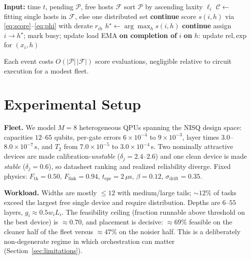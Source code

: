 \documentclass[conference]{IEEEtran}
\begin{document}
\begin{algorithm}[t]
\caption{AMOS: one orchestration event}
\label{alg:amos}
\begin{algorithmic}[1]
\State \textbf{Input:} time $t$, pending $\mathcal{P}$, free hosts $\mathcal{F}$
\State sort $\mathcal{P}$ by ascending laxity $\ell_i$
  \State $\mathcal{C}\gets$ fitting single hosts in $\mathcal{F}$, else one
         distributed set
   \textbf{continue} \EndIf
     \State score $s(i,h)$ via \eqref{eq:score}--\eqref{eq:phi} with derate
     $r_{ih}$
  \EndFor
  \State $h^\star\gets\arg\max_h s(i,h)$
   \textbf{continue} \EndIf
  \State assign $i\!\to\!h^\star$; mark busy; update load EMA
\EndFor
\State \textbf{on completion of} $i$ \textbf{on} $h$:
       update $\mathrm{rel},\mathrm{exp}$ for $(x_i,h)$
\end{algorithmic}
\end{algorithm}

Each event costs $O(|\mathcal{P}|\,|\mathcal{F}|)$ score evaluations, negligible
relative to circuit execution for a modest fleet.

\section{Experimental Setup}
\label{sec:setup}
\textbf{Fleet.} We model $M{=}8$ heterogeneous QPUs spanning the NISQ design
space: capacities $12$--$65$ qubits, per-gate errors $6\!\times\!10^{-4}$ to
$9\!\times\!10^{-3}$, layer times $3.0$--$8.0\!\times\!10^{-7}$\,s, and $T_2$ from
$7.0\!\times\!10^{-5}$ to $3.0\!\times\!10^{-4}$\,s. Two nominally attractive
devices are made calibration-\emph{unstable} ($\delta_j{=}2.4$--$2.6$) and one
clean device is made \emph{stable} ($\delta_j{=}0.6$), so datasheet ranking and
realized reliability diverge. Fixed physics: $F_{\text{th}}{=}0.50$,
$F_{\text{link}}{=}0.94$, $t_{\text{epr}}{=}2\,\mu$s, $\beta{=}0.12$,
$\sigma_{\text{drift}}{=}0.35$.

\textbf{Workload.} Widths are mostly $\le\!12$ with medium/large tails;
$\sim\!12\%$ of tasks exceed the largest free single device and require
distribution. Depths are $6$--$55$ layers, $g_i\!\approx\!0.5w_iL_i$. The
feasibility ceiling (fraction runnable above threshold on the best device) is
$\approx\!0.70$, and placement is decisive: $\approx\!69\%$ feasible on the
cleaner half of the fleet versus $\approx\!47\%$ on the noisier half. This is a
deliberately non-degenerate regime in which orchestration can matter
(Section~\ref{sec:limitations}).
\end{document}
